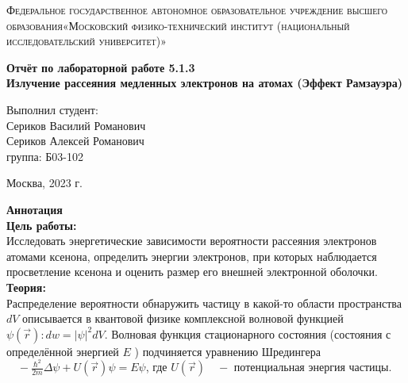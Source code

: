 \documentclass[a4paper, 12pt]{article}%
\begin{document}
	\begin{titlepage}
		\begin{center}
			\textsc{Федеральное государственное автономное образовательное учреждение высшего образования«Московский физико-технический институт (национальный исследовательский университет)»\\[5mm]
			}
			
			\vfill
			
			\textbf{Отчёт по лабораторной работе 5.1.3\\[3mm]
				Излучение рассеяния медленных электронов на атомах (Эффект Рамзауэра)
				\\[50mm]
			}
			
		\end{center}
		
		\hfill
		\begin{minipage}{.5\textwidth}
			Выполнил студент:\\[2mm]
			Сериков Василий Романович\\[2mm]
			Сериков Алексей Романович\\[2mm]
			группа: Б03-102\\[5mm]
			
		\end{minipage}
		\vfill
		\begin{center}
			Москва, 2023 г.
		\end{center}
		
	\end{titlepage}
	
	\newpage
	\setcounter{page}{2}
	\textbf{Аннотация}\\
	
	\textbf{Цель работы: }\\
	
	Исследовать энергетические зависимости вероятности рассеяния электронов атомами ксенона, определить энергии электронов, при которых наблюдается просветление ксенона и оценить размер его внешней электронной оболочки. \\
	
	\textbf{Теория: }\\
	
	Распределение вероятности обнаружить частицу в какой-то области пространства $d V$ описывается в квантовой физике комплексной волновой функцией $\psi(\vec{r}): d w=|\psi|^2 d V$. Волновая функция стационарного состояния (состояния с определённой энергией $E$ ) подчиняется уравнению Шредингера $\quad-\frac{\hbar^2}{2 m} \Delta \psi+U(\vec{r}) \psi=E \psi$, где $U(\vec{r}) \quad-$ потенциальная энергия частицы.
	
\end{document}
